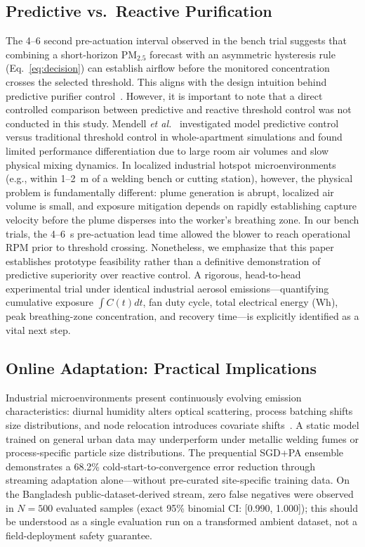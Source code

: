 \documentclass[12pt,a4paper]{article}
\newcommand{\etal}{\textit{et al.}}
\begin{document}
\subsection{Predictive vs.\ Reactive Purification}
The 4--6 second pre-actuation interval observed in the bench trial suggests that
combining a short-horizon PM$_{2.5}$ forecast with an asymmetric hysteresis rule
(Eq.~\ref{eq:decision}) can establish airflow before the monitored concentration
crosses the selected threshold. This aligns with the design intuition behind predictive
purifier control~\citep{energyeff2024benv,beldar2025aipurifier}. However, it is important
to note that a direct controlled comparison between predictive and reactive threshold
control was not conducted in this study. Mendell \etal{}~\citep{mendell2025predictive}
investigated model predictive control versus traditional threshold control in whole-apartment simulations
and found limited performance differentiation due to large room air volumes and slow physical mixing dynamics.
In localized industrial hotspot microenvironments (e.g., within 1--2~m of a welding bench or cutting station),
however, the physical problem is fundamentally different: plume generation is abrupt, localized air volume is small,
and exposure mitigation depends on rapidly establishing capture velocity before the plume disperses into the worker's
breathing zone. In our bench trials, the 4--6~s pre-actuation lead time allowed the blower to reach operational RPM
prior to threshold crossing. Nonetheless, we emphasize that this paper establishes prototype feasibility rather than a
definitive demonstration of predictive superiority over reactive control. A rigorous, head-to-head experimental trial
under identical industrial aerosol emissions---quantifying cumulative exposure $\int C(t)dt$, fan duty cycle, total electrical
energy (Wh), peak breathing-zone concentration, and recovery time---is explicitly identified as a vital next step.

\subsection{Online Adaptation: Practical Implications}
Industrial microenvironments present continuously evolving emission characteristics:
diurnal humidity alters optical scattering, process batching shifts size distributions,
and node relocation introduces covariate shifts~\citep{basak2025spatial}. A static model
trained on general urban data may underperform under metallic welding fumes or process-specific
particle size distributions. The prequential SGD+PA ensemble demonstrates a 68.2\%
cold-start-to-convergence error reduction through streaming adaptation alone---without
pre-curated site-specific training data. On the Bangladesh public-dataset-derived stream,
zero false negatives were observed in $N=500$ evaluated samples (exact 95\% binomial CI:
[0.990, 1.000]); this should be understood as a single evaluation run on a
transformed ambient dataset, not a field-deployment safety guarantee.
\end{document}
